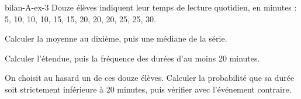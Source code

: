\begin{blocEdition}{bilan-A-ex-3}
Douze élèves indiquent leur temps de lecture quotidien, en minutes : 5, 10, 10, 10, 15, 15, 20, 20, 20, 25, 25, 30.\begin{questions}
\item Calculer la moyenne au dixième, puis une médiane de la série.
\item Calculer l’étendue, puis la fréquence des durées d’au moins 20 minutes.
\item On choisit au hasard un de ces douze élèves. Calculer la probabilité que sa durée soit strictement inférieure à 20 minutes, puis vérifier avec l’événement contraire.
\end{questions}\par{}\par\par{}\par{}\par{}\par{}\par{}\par{}
\end{blocEdition}
